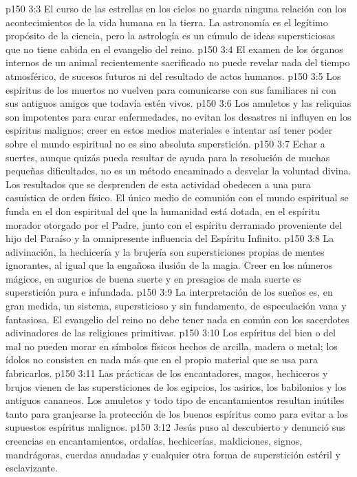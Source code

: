 \vs p150 3:3 El curso de las estrellas en los cielos no guarda ninguna relación con los acontecimientos de la vida humana en la tierra. La astronomía es el legítimo propósito de la ciencia, pero la astrología es un cúmulo de ideas supersticiosas que no tiene cabida en el evangelio del reino.
\vs p150 3:4 El examen de los órganos internos de un animal recientemente sacrificado no puede revelar nada del tiempo atmosférico, de sucesos futuros ni del resultado de actos humanos.
\vs p150 3:5 Los espíritus de los muertos no vuelven para comunicarse con sus familiares ni con sus antiguos amigos que todavía estén vivos.
\vs p150 3:6 Los amuletos y las reliquias son impotentes para curar enfermedades, no evitan los desastres ni influyen en los espíritus malignos; creer en estos medios materiales e intentar así tener poder sobre el mundo espiritual no es sino absoluta superstición.
\vs p150 3:7 Echar a suertes, aunque quizás pueda resultar de ayuda para la resolución de muchas pequeñas dificultades, no es un método encaminado a desvelar la voluntad divina. Los resultados que se desprenden de esta actividad obedecen a una pura casuística de orden físico. El único medio de comunión con el mundo espiritual se funda en el don espiritual del que la humanidad está dotada, en el espíritu morador otorgado por el Padre, junto con el espíritu derramado proveniente del hijo del Paraíso y la omnipresente influencia del Espíritu Infinito.
\vs p150 3:8 La adivinación, la hechicería y la brujería son supersticiones propias de mentes ignorantes, al igual que la engañosa ilusión de la magia. Creer en los números mágicos, en augurios de buena suerte y en presagios de mala suerte es superstición pura e infundada.
\vs p150 3:9 La interpretación de los sueños es, en gran medida, un sistema, supersticioso y sin fundamento, de especulación vana y fantasiosa. El evangelio del reino no debe tener nada en común con los sacerdotes adivinadores de las religiones primitivas.
\vs p150 3:10 Los espíritus del bien o del mal no pueden morar en símbolos físicos hechos de arcilla, madera o metal; los ídolos no consisten en nada más que en el propio material que se usa para fabricarlos.
\vs p150 3:11 Las prácticas de los encantadores, magos, hechiceros y brujos vienen de las supersticiones de los egipcios, los asirios, los babilonios y los antiguos cananeos. Los amuletos y todo tipo de encantamientos resultan inútiles tanto para granjearse la protección de los buenos espíritus como para evitar a los supuestos espíritus malignos.
\vs p150 3:12 Jesús puso al descubierto y denunció sus creencias en encantamientos, ordalías, hechicerías, maldiciones, signos, mandrágoras, cuerdas anudadas y cualquier otra forma de superstición estéril y esclavizante.
